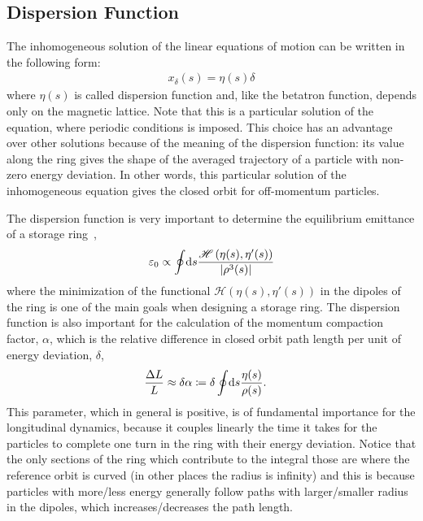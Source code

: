 \subsection{Dispersion Function}

	The inhomogeneous solution of the linear equations of motion can be written in the following form:
	\begin{align}\label{eq:dispersion_function}
		x_\delta(s) = \eta(s)\delta
	\end{align}
	where $\eta(s)$ is called dispersion function and, like the betatron function, depends only on the magnetic lattice. Note that this is a particular solution of the equation, where periodic conditions is imposed. This choice has an advantage over other solutions because of the meaning of the dispersion function: its value along the ring gives the shape of the averaged trajectory of a particle with non-zero energy deviation. In other words, this particular solution of the inhomogeneous equation gives the closed orbit for off-momentum particles.

	The dispersion function is very important to determine the equilibrium emittance of a storage ring~\cite[pp. 304]{Wiedemann2007},
    \begin{align}
        \varepsilon_0 \propto \oint\!\text{d}s \frac
                        {\mathscr{H}\left(\eta(s),\eta'(s)\right)}
                        {\left|\rho^3(s)\right|}
    \end{align}
     where the minimization of the functional $\mathscr{H}(\eta(s), \eta'(s))$ in the dipoles of the ring is one of the main goals when designing a storage ring. The dispersion function is also important for the calculation of the momentum compaction factor, $\alpha$, which is the relative difference in closed orbit path length per unit of energy deviation, $\delta$,
	\begin{align}\label{eq:momentum_compaction}
		\frac{\Delta L}{L} &\approx \delta \alpha \coloneqq \delta \oint\!\text{d}s \frac{\eta(s)}{\rho(s)}.
	\end{align}
	This parameter, which in general is positive, is of fundamental importance for the longitudinal dynamics, because it couples linearly the time it takes for the particles to complete one turn in the ring with their energy deviation. Notice that the only sections of the ring which contribute to the integral those are where the reference orbit is curved (in other places the radius is infinity) and this is because particles with more/less energy generally follow paths with larger/smaller radius in the dipoles, which increases/decreases the path length.

